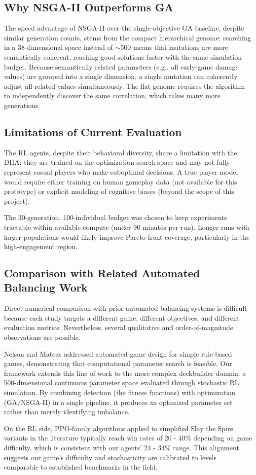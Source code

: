 \subsection{Why NSGA-II Outperforms GA}

The speed advantage of NSGA-II over the single-objective GA baseline, despite similar generation counts, stems from the compact hierarchical genome: searching in a 38-dimensional space instead of $\sim$500 means that mutations are more semantically coherent, reaching good solutions faster with the same simulation budget. Because semantically related parameters (e.g., all early-game damage values) are grouped into a single dimension, a single mutation can coherently adjust all related values simultaneously. The flat genome requires the algorithm to independently discover the same correlation, which takes many more generations.

\subsection{Limitations of Current Evaluation}

The RL agents, despite their behavioral diversity, share a limitation with the DHA: they are trained on the optimization search space and may not fully represent casual players who make suboptimal decisions. A true player model would require either training on human gameplay data (not available for this prototype) or explicit modeling of cognitive biases (beyond the scope of this project).

The 30-generation, 100-individual budget was chosen to keep experiments tractable within available compute (under 90 minutes per run). Longer runs with larger populations would likely improve Pareto front coverage, particularly in the high-engagement region.

\subsection{Comparison with Related Automated Balancing Work}

Direct numerical comparison with prior automated balancing systems is difficult because each study targets a different game, different objectives, and different evaluation metrics. Nevertheless, several qualitative and order-of-magnitude observations are possible.

Nelson and Mateas \cite{nelson2007towards} addressed automated game design for simple rule-based games, demonstrating that computational parameter search is feasible. Our framework extends this line of work to the more complex deckbuilder domain: a 500-dimensional continuous parameter space evaluated through stochastic RL simulation. By combining detection (the fitness functions) with optimization (GA/NSGA-II) in a single pipeline, it produces an optimized parameter set rather than merely identifying imbalance.

On the RL side, PPO-family algorithms applied to simplified Slay the Spire variants in the literature typically reach win rates of 20 - 40\% depending on game difficulty, which is consistent with our agents' 24 - 34\% range. This alignment suggests our game's difficulty and stochasticity are calibrated to levels comparable to established benchmarks in the field.
